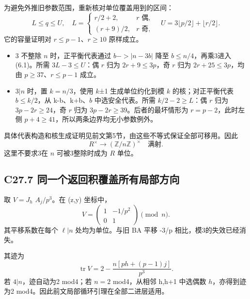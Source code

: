 \documentclass[11pt,a4paper]{article}
\newcommand{\tightlist}{\setlength{\itemsep}{0pt}\setlength{\parskip}{0pt}}
\theoremstyle{definition}
\numberwithin{equation}{section}
\begin{document}
{为避免外推旧参数范围，重新核对单位覆盖用到的区间：} \[
L\le q\le U,\quad
L=\begin{cases}r/2+2,&r\text{ 偶},\\(r+9)/2,&r\text{ 奇},\end{cases}
\quad U=3\lfloor p/2\rfloor+\lfloor r/2\rfloor.
\tag{C27.6.1}
\] {它的容量证明对} {\ensuremath{r\le p-1}、\ensuremath{r\ge 10}} {原样成立。}

\begin{itemize}
\tightlist
\item
  {3} {不整除} {\ensuremath{n}} {时，正平衡代表通过} {\ensuremath{b->|n-3b|}} {降至} {\ensuremath{b\le n/4}，再乘3进入} {(6.1)。所需} {\ensuremath{3L-3\le U}：偶} {\ensuremath{r}} {归为} {\ensuremath{2r+9\le 3p}，奇} {\ensuremath{r}} {归为} {\ensuremath{2r+25\le 3p}，均由} {\ensuremath{p\ge 37}、\ensuremath{r\le p-1}} {成立。}
\item
  {\ensuremath{3|n}} {时，置} {\ensuremath{k=n/3}，使用} {\ensuremath{k}±1} {生成单位约化到模} {\ensuremath{k}} {的核；对正平衡代表} {\ensuremath{b\le k/2}，从} {k-b、k+b、\ensuremath{b}} {中选安全代表。所需} {\ensuremath{k/2-2\ge L}：偶} {\ensuremath{r}} {归为} {\ensuremath{3p-2r\ge 24}，奇} {\ensuremath{r}} {归为} {\ensuremath{3p-2r\ge 39}。后者的最坏情形为} {\ensuremath{r=p-2}，此时左侧} {\ensuremath{p+4\ge 41}，所以两条边界均无小参数例外。}
\end{itemize}

{具体代表构造和核生成证明见前文第5节，由这些不等式保证全部可移用。因此} \[
R^\times\longrightarrow(\mathbb Z/n\mathbb Z)^\times
\quad\text{满射}.
\tag{C27.6.2}
\] {这里不要求3在} {\ensuremath{n}} {可被3整除时成为} {\ensuremath{R}} {单位。}

\subsection*{\texorpdfstring{{C27.7} {同一个返回积覆盖所有局部方向}}{C27.7 同一个返回积覆盖所有局部方向}}\label{C27-h174}

{取} {\ensuremath{V=J_{h}}} {\ensuremath{A_{j}/p^{3}}。在} {(z,y)} {坐标中，} \[
\boxed{V=\begin{pmatrix}1&-1/p^2\\0&1\end{pmatrix}\pmod n.}
\tag{C27.7.1}
\] {其平移系数在每个} {\ensuremath{\ell |n}} {处均为单位。与旧} {BA} {平移} {-3/p} {相比，模3的失效已经消失。}

{其迹为} \[
\operatorname{tr}V=
2-\frac{n[ph+(p-1)j]}{p^3}.
\tag{C27.7.2}
\] {若} {\ensuremath{4|n}，迹自动为2} {mod4；若} {\ensuremath{n=2}} {mod4，从相邻} {h,h+1} {中选偶数} {\ensuremath{h}，亦得到迹为2} {mod4。因此前文局部循环引理在全部二进层适用。}
\end{document}
